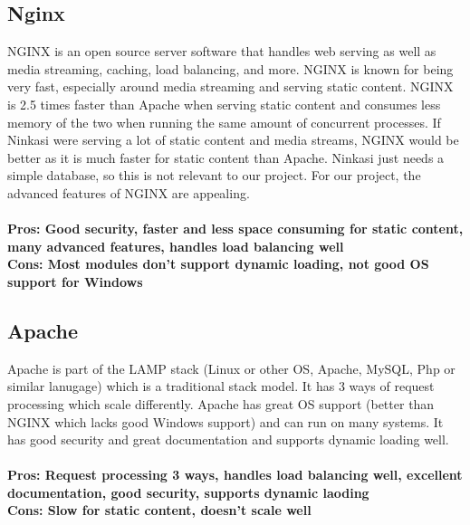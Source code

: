 \documentclass[draftclsnofoot,onecolumn,letterpaper,10pt,compsoc]{IEEEtran}
\begin{document}
	\subsection{Nginx}
		NGINX is an open source server software that handles web serving as well as media streaming, caching, load balancing, and more\cite{NGINX}.
		NGINX is known for being very fast, especially around media streaming and serving static content\cite{NGINX}.
		NGINX is 2.5 times faster than Apache when serving static content and consumes less memory of the two when running the same amount of concurrent processes\cite{HostingAd}.
		If Ninkasi were serving a lot of static content and media streams, NGINX would be better as it is much faster for static content than Apache.
		Ninkasi just needs a simple database, so this is not relevant to our project.
		For our project, the advanced features of NGINX are appealing.
		\\ \\
		\textbf{Pros: Good security, faster and less space consuming for static content, many advanced features, handles load balancing well}
		\\
		\textbf{Cons: Most modules don't support dynamic loading, not good OS support for Windows}

	\subsection{Apache}
		Apache is part of the LAMP stack (Linux or other OS, Apache, MySQL, Php or similar lanugage) which is a traditional stack model\cite{UpWork}.
		It has 3 ways of request processing which scale differently.
		Apache has great OS support (better than NGINX which lacks good Windows support) and can run on many systems\cite{HostingAd}.
		It has good security and great documentation and supports dynamic loading well\cite{HostingAd}.
		\\ \\
		\textbf{Pros: Request processing 3 ways, handles load balancing well, excellent documentation, good security, supports dynamic laoding}
		\\
		\textbf{Cons: Slow for static content, doesn't scale well}
\end{document}

